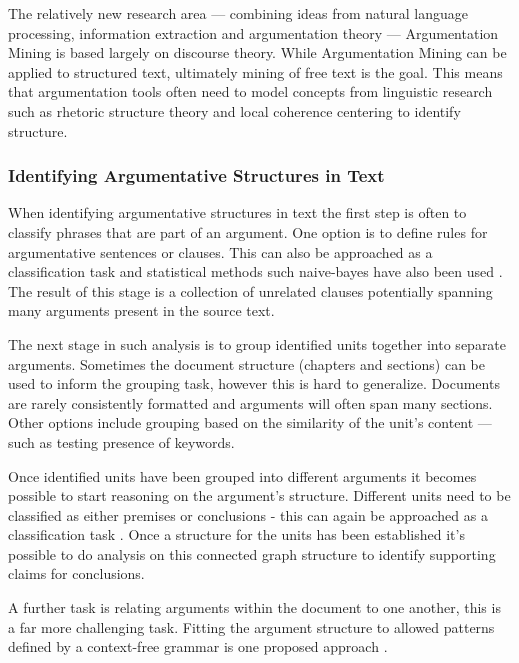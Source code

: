       The relatively new research area  --- combining ideas from natural language processing, information extraction and argumentation theory --- Argumentation Mining is based largely on discourse theory. While Argumentation Mining can be applied to structured text, ultimately mining of free text is the goal. This means that argumentation tools often need to model concepts from linguistic research such as rhetoric structure theory \cite{mann1988rhetorical} and local coherence centering \cite{weinstein21centering} to identify structure.

      \tocless\subsubsection{Identifying Argumentative Structures in Text}

        When identifying argumentative structures in text the first step is often to classify phrases that are part of an argument. One option is to define rules for argumentative sentences or clauses. This can also be approached as a classification task and statistical methods such naive-bayes have also been used \cite{palau2009argumentation}. The result of this stage is a collection of unrelated clauses potentially spanning many arguments present in the source text.

        The next stage in such analysis is to group identified units together into separate arguments. Sometimes the document structure (chapters and sections) can be used to inform the grouping task, however this is hard to generalize. Documents are rarely consistently formatted and arguments will often span many sections. Other options include grouping based on the similarity of the unit's content --- such as testing presence of keywords. \cite{palau2009argumentation}

        Once identified units have been grouped into different arguments it becomes possible to start reasoning on the argument's structure. Different units need to be classified as either premises or conclusions - this can again be approached as a classification task \cite{palau2009argumentation}. Once a structure for the units has been established it's possible to do analysis on this connected graph structure to identify supporting claims for conclusions.

        A further task is relating arguments within the document to one another, this is a far more challenging task. Fitting the argument structure to allowed patterns defined by a context-free grammar is one proposed approach \cite{palau2009argumentation}.

